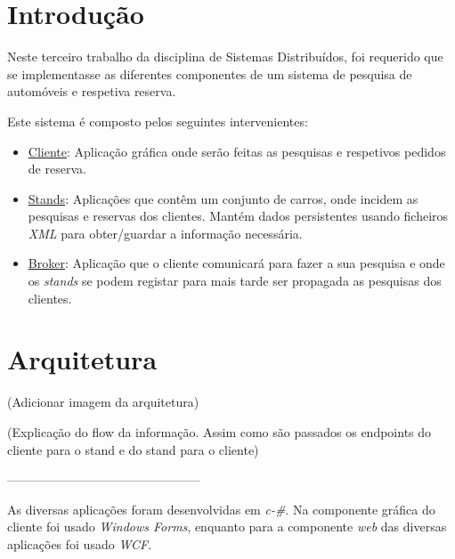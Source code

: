 \documentclass[a4paper]{article}
\begin{document}
\newpage
\thispagestyle{empty} %

\tableofcontents

\newpage
\setcounter{page}{1} %

\section{Introdução}

Neste terceiro trabalho da disciplina de Sistemas Distribuídos, foi requerido que se implementasse as diferentes componentes de um sistema de pesquisa de automóveis e respetiva reserva.

Este sistema é composto pelos seguintes intervenientes:

\begin{itemize}

\item
\underline{Cliente}: Aplicação gráfica onde serão feitas as pesquisas e respetivos pedidos de reserva.

\item
\underline{Stands}: Aplicações que contêm um conjunto de carros, onde incidem as pesquisas e reservas dos clientes. Mantém dados persistentes usando ficheiros \emph{XML} para obter/guardar a informação necessária. 

\item
\underline{Broker}: Aplicação que o cliente comunicará para fazer a sua pesquisa e onde os \emph{stands} se podem registar para mais tarde ser propagada as pesquisas dos clientes.

\end{itemize}


\section{Arquitetura}
(Adicionar imagem da arquitetura)

(Explicação do flow da informação. Assim como são passados os endpoints do cliente para o stand e do stand para o cliente)

-----------------------------------------------

As diversas aplicações foram desenvolvidas em \emph{c-\#}. Na componente gráfica do cliente foi usado \emph{Windows Forms}, enquanto para a componente \emph{web} das diversas aplicações foi usado \emph{WCF}.
\end{document}
